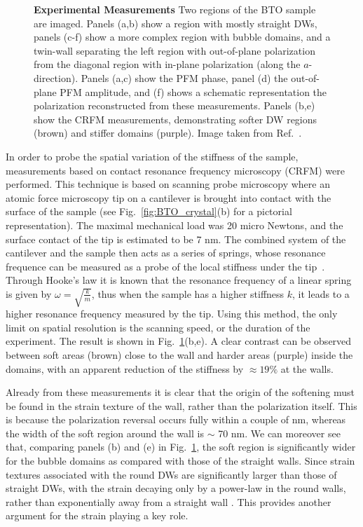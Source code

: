 \begin{figure}
	\caption{\label{fig:BTO_experiment} {\bf Experimental Measurements} Two regions of the BTO sample are imaged. Panels (a,b) show a region with mostly straight DWs, panels (c-f) show a more complex region with bubble domains, and a twin-wall separating the left region with out-of-plane polarization from the diagonal region with in-plane polarization (along the $a$-direction). Panels (a,c) show the PFM phase, panel (d) the out-of-plane PFM amplitude, and (f) shows a schematic representation the polarization reconstructed from these measurements. Panels (b,e) show the CRFM measurements, demonstrating softer DW regions (brown) and stiffer domains (purple). Image taken from Ref.~\cite{Stefani2020}.}
\end{figure}

In order to probe the spatial variation of the stiffness of the sample, measurements based on contact resonance frequency microscopy (CRFM) were performed.
This technique is based on scanning probe microscopy where an atomic force microscopy tip on a cantilever is brought into contact with the surface of the sample (see Fig.~\ref{fig:BTO_crystal}(b) for a pictorial representation).
The maximal mechanical load was 20 micro Newtons, and the surface contact of the tip is estimated to be 7 nm.
The combined system of the cantilever and the sample then acts as a series of springs, whose resonance frequence can be measured as a probe of the local stiffness under the tip~\cite{Rabe2000}.
Through Hooke's law it is known that the resonance frequency of a linear spring is given by $\omega = \sqrt{\frac{k}{m}}$, thus when the sample has a higher stiffness $k$, it leads to a higher resonance frequency measured by the tip.
Using this method, the only limit on spatial resolution is the scanning speed, or the duration of the experiment.
The result is shown in Fig.~\ref{fig:BTO_experiment}(b,e).
A clear contrast can be observed between soft areas (brown) close to the wall and harder areas (purple) inside the domains, with an apparent reduction of the stiffness by $\approx 19\%$ at the walls.


Already from these measurements it is clear that the origin of the softening must be found in the strain texture of the wall, rather than the polarization itself.
This is because the polarization reversal occurs fully within a couple of nm, whereas the width of the soft region around the wall is $\sim$ 70 nm.
We can moreover see that, comparing panels (b) and (e) in Fig.~\ref{fig:BTO_experiment}, the soft region is significantly wider for the bubble domains as compared with those of the straight walls.
Since strain textures associated with the round DWs are significantly larger than those of straight DWs, with the strain decaying only by a power-law in the round walls, rather than exponentially away from a straight wall \cite{Landau1960}.
This provides another argument for the strain playing a key role.

